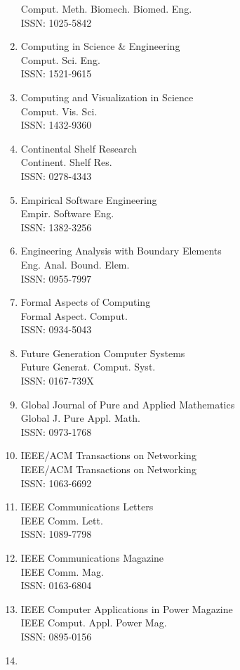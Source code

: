 \begin{enumerate}
 Comput. Meth. Biomech. Biomed. Eng.\\
 ISSN: 1025-5842
\item
 Computing in Science \& Engineering\\
 Comput. Sci. Eng.\\
 ISSN: 1521-9615
\item
 Computing and Visualization in Science\\
 Comput. Vis. Sci.\\
 ISSN: 1432-9360
\item
 Continental Shelf Research\\
 Continent. Shelf Res.\\
 ISSN: 0278-4343
\item
 Empirical Software Engineering\\
 Empir. Software Eng.\\
 ISSN: 1382-3256
\item
 Engineering Analysis with Boundary Elements\\
 Eng. Anal. Bound. Elem.\\
 ISSN: 0955-7997
\item
 Formal Aspects of Computing\\
 Formal Aspect. Comput.\\
 ISSN: 0934-5043
\item
 Future Generation Computer Systems\\
 Future Generat. Comput. Syst.\\
 ISSN: 0167-739X
\item
 Global Journal of Pure and Applied Mathematics\\
 Global J. Pure Appl. Math.\\
 ISSN: 0973-1768
\item
 IEEE/ACM Transactions on Networking\\
 IEEE/ACM Transactions on Networking\\
 ISSN: 1063-6692
\item
 IEEE Communications Letters\\
 IEEE Comm. Lett.\\
 ISSN: 1089-7798
\item
 IEEE Communications Magazine\\
 IEEE Comm. Mag.\\
 ISSN: 0163-6804
\item
 IEEE Computer Applications in Power Magazine\\
 IEEE Comput. Appl. Power Mag.\\
 ISSN: 0895-0156
\item

\end{enumerate}
